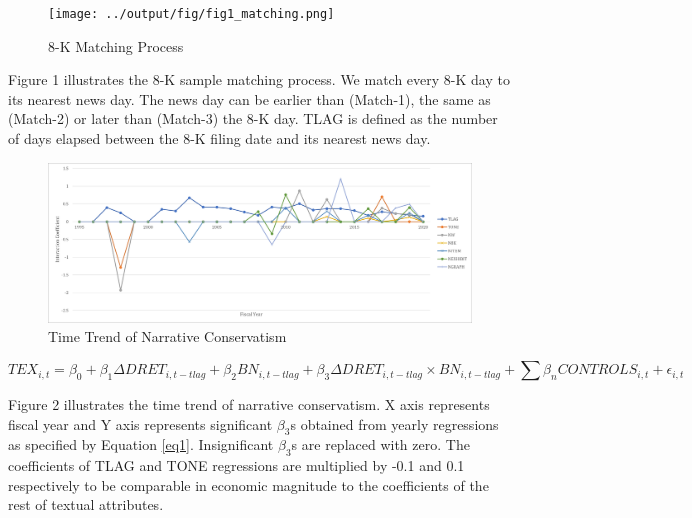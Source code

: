 \begin{figure}
	\caption{8-K Matching Process} \label{fig1}
	\begin{center}
		\texttt{[image: ../output/fig/fig1\_matching.png]}
	\end{center}
\end{figure}

\begin{footnotesize}
	\noindent Figure 1 illustrates the 8-K sample matching process. We match every 8-K day to its nearest news day. The news day can be earlier than (Match-1), the same as (Match-2) or later than (Match-3) the 8-K day. TLAG is defined as the number of days elapsed between the 8-K filing date and its nearest news day.
\end{footnotesize}

\newpage
\begin{landscape}
	\begin{figure}[H]
		\begin{center}
			\caption{Time Trend of Narrative Conservatism} \label{fig2}
			\includegraphics[scale=0.7]{../output/fig/fig2_time_trend_8K.png}
		\end{center}
	\end{figure}

\begin{footnotesize}
	\setcounter{equation}{0}
	\begin{equation}
		TEX_{i,t}=\beta_0+\beta_1\Delta DRET_{i,t-tlag}+\beta_2BN_{i,t-tlag}+\beta_3\Delta DRET_{i,t-tlag}\times 	BN_{i,t-tlag}+\sum\beta_nCONTROLS_{i,t}+\epsilon_{i,t}
	\end{equation}

	\noindent Figure 2 illustrates the time trend of narrative conservatism. X axis represents fiscal year and Y axis represents significant $\beta_3$s obtained from yearly regressions as specified by Equation \eqref{eq1}. Insignificant $\beta_3$s are replaced with zero. The coefficients of TLAG and TONE regressions are multiplied by -0.1 and 0.1 respectively to be comparable in economic magnitude to the coefficients of the rest of textual attributes.  
\end{footnotesize}
\end{landscape}